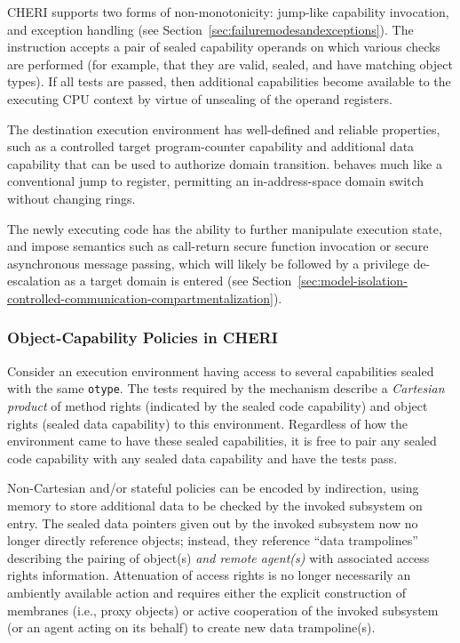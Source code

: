 CHERI supports two forms of non-monotonicity: jump-like capability invocation,
and exception handling (see Section~\ref{sec:failuremodesandexceptions}).
The  instruction accepts a pair of sealed
capability operands on which various checks are performed (for example, that
they are valid, sealed, and have matching object types).
If all tests are passed, then additional capabilities become available to the
executing CPU context by virtue of unsealing of the operand
registers.

The destination execution environment has well-defined and
reliable properties, such as a controlled target program-counter capability
and additional data capability that can be used to authorize domain
transition.
 behaves much like a conventional jump to register, permitting an
in-address-space domain switch without changing rings.

The newly executing code has the ability to further manipulate
execution state, and impose semantics such as call-return secure function
invocation or secure asynchronous message passing,
which will likely be followed by a privilege de-escalation as a target domain
is entered (see
Section~\ref{sec:model-isolation-controlled-communication-compartmentalization}).

\subsubsection{Object-Capability Policies in CHERI}

Consider an execution environment having access to several capabilities
sealed with the same \texttt{otype}.  The tests required by the
 mechanism describe a \emph{Cartesian product} of method
rights (indicated by the sealed code capability) and object rights (sealed data
capability) to this environment.  Regardless of how the environment
came to have these sealed capabilities, it is free to pair any sealed code
capability with any sealed data capability and have the 
tests pass.

Non-Cartesian and/or stateful policies can be encoded by
indirection, using memory to store additional data to be checked by the
invoked subsystem on entry.  The sealed data pointers given out by the
invoked subsystem now no longer directly reference objects; instead, they
reference ``data trampolines'' describing the pairing of object(s) \emph{and
remote agent(s)} with associated access rights information.  Attenuation of
access rights is no longer necessarily an ambiently available action and
requires either the explicit construction of membranes (i.e., proxy objects)
or active cooperation of the invoked subsystem (or an agent acting on its
behalf) to create new data trampoline(s).

